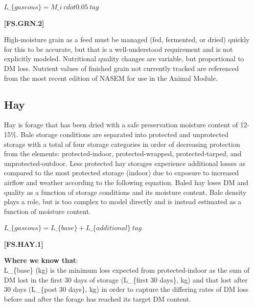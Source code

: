 \begin{refsection}
    \begin{center}
        \(L\_\{gaseous\}  = M\_i\ cdot 0.05\ tag\)
    \end{center}
        \vspace{0.5cm}
    
            {\raggedleft \textbf{[FS.GRN.2]}\par}
            \vspace{0.5cm}
            
High-moisture grain as a feed must be managed (fed, fermented, or dried) quickly for this to be accurate, but that is a well-understood requirement and is not explicitly modeled. Nutritional quality changes are variable, but proportional to DM loss. Nutrient values of finished grain not currently tracked are referenced from the most recent edition of NASEM for use in the Animal Module.

\subsection{Hay} Hay is forage that has been dried with a safe preservation moisture content of 12-15\%. Bale storage conditions are separated into protected and unprotected storage with a total of four storage categories in order of decreasing protection from the elements: protected-indoor, protected-wrapped, protected-tarped, and unprotected-outdoor. Less protected hay storages experience additional losses as compared to the most protected storage (indoor) due to exposure to increased airflow and weather according to the following equation. Baled hay loses DM and quality as a function of storage conditions and its moisture content. Bale density plays a role, but is too complex to model directly and is instead estimated as a function of moisture content.

    \begin{center}
        \(L\_\{gaseous\}  = L\_\{base\} + L\_\{additional\}\ tag\)
    \end{center}
        \vspace{0.5cm}
    
            {\raggedleft \textbf{[FS.HAY.1]}\par}
            \vspace{0.5cm}


\textbf{Where we know that}: \\ L\_\{base\} (kg) is the minimum loss expected from protected-indoor as the sum of DM lost in the first 30 days of storage (L\_\{first 30 days\}, kg) and that lost after 30 days (L\_\{post 30 days\}, kg) in order to capture the differing rates of DM loss before and after the forage has reached its target DM content.


\end{refsection}
